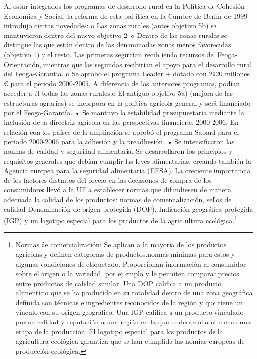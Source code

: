 \documentclass[10pt,a4paper]{article}
\begin{document}
Al estar integrados los programas de desarrollo rural en la Política de Cohesión Económica y Social, la reforma de esta poi ítica en la Cumbre de Berlín de 1999 introdujo ciertas novedades: o Las zonas rurales (antes objetivo 5b) se mantuvieron dentro del nuevo objetivo 2. o Dentro de las zonas rurales se distingue las que están dentro de las denominadas zonas menos favorecidas (objetivo 1) y el resto. Las primeras seguirían recib iendo recursos del Feoga-Orientación, mientras que las segundas recibirían el apoyo para el desarrollo rural del Feoga-Garantía. o Se aprobó el programa Leader + dotado con 2020 millones € para el periodo 2000-2006. A diferencia de los anteriores programas, podían acceder a él todas las zonas rurales.o El antiguo objetivo 5a) (mejora de las estructuras agrarias) se incorpora en la política agrícola general y será financiado por el Feoga-Garantía.
• Se mantuvo la estabilidad presupuestaria mediante la inclusión de la directriz agrícola en las perspectivas financieras 2000-2006. En relación con los países de la ampliación se aprobó el programa Sapard para el periodo 2000-2006 para la adhesión y la preadhesión.
• Se intensificaron las nonnas de calidad y seguridad alimentaria. Se desarrollaron los principios y requisitos generales que debían cumplir las leyes alimentarias, creando también la Agencia europea para la seguridad alimentaria (EFSA). La creciente importancia de los factores distintos del precio en las decisiones de compra de los consumidores llevó a la UE a establecer normas que difundiesen de manera adecuada la calidad de los productos: normas de comercialización, sellos de calidad Denominación de origen protegida (DOP), Indicación geográfica protegida (IGP) y un logotipo especial para los productos de la agric ultura ecológica.\footnote{%
    Normas de comercialización: Se aplican a la mayoría de los productos agrícolas y definen categorías de productos.nonnas mínimas para estos y algunas condiciones de etiquetado. Proporcionan información al consumidor sobre el origen o la variedad, por ej emplo y le penniten comparar precios entre productos de calidad similar. Una DOP califica a un producto alimenticio que se ha producido en su totalidad dentro de una zona geográfica definida con técnicas e ingredientes reconocidos de la región y que tiene un vínculo con su origen geográfico. Una IGP califica a un producto vinculado por su calidad y reputación a una región en la que se desarrolla al menos una etapa de la producción. El logotipo especial para los productos de la agricultura ecológica garantiza que se han cumplido las nomias europeas de producción ecológica.
}
\end{document}
